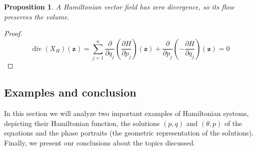 \documentclass[a4paper,12pt] {article}
\newtheorem{proposition}{Proposition}[section]
\begin{document}
\begin{proposition}
    A Hamiltonian vector field has zero divergence, so its flow preserves the volume.
\end{proposition}

\begin{proof}
\[
\operatorname{div}(X_H)(\mathbf{z}) = \displaystyle \sum_{j=1}^n \dfrac{\partial}{\partial q_j}\left(\dfrac{\partial H}{\partial p_j}\right)(\mathbf{z}) + \dfrac{\partial}{\partial p_j}\left(-\dfrac{\partial H}{\partial q_j}\right)(\mathbf{z}) = 0 
\]
\end{proof}

\subsection{Examples and conclusion}

In this section we will analyze two important examples of Hamiltonian systems, depicting their Hamiltonian function, the solutions $(p,q)$ and $(\theta,p)$ of the equations and the phase portraits (the geometric representation of the solutions). Finally, we present our conclusions about the topics discussed.\\
\end{document}
